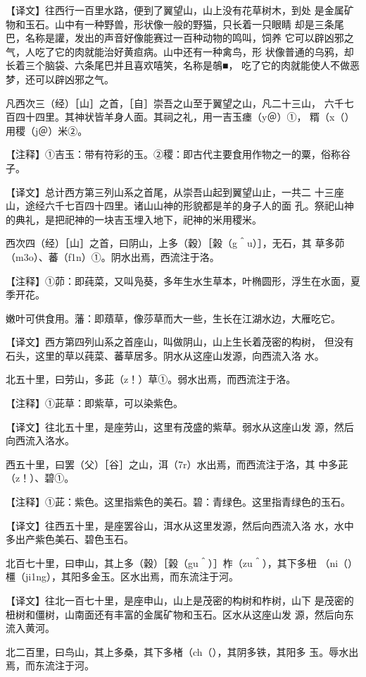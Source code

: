 \documentclass[a4paper,12pt,UTF8,twoside]{ctexbook}
\begin{document}
【译文】往西行一百里水路，便到了翼望山，山上没有花草树木，到处 是金属矿物和玉石。山中有一种野兽，形状像一般的野猫，只长着一只眼睛 却是三条尾巴，名称是讙，发出的声音好像能赛过一百种动物的鸣叫，饲养 它可以辟凶邪之气，人吃了它的肉就能治好黄疸病。山中还有一种禽鸟，形 状像普通的乌鸦，却长着三个脑袋、六条尾巴并且喜欢嘻笑，名称是鵸■， 吃了它的肉就能使人不做恶梦，还可以辟凶邪之气。

凡西次三（经）［山］之首，［自］崇吾之山至于翼望之山，凡二十三山， 六千七百四十四里。其神状皆羊身人面。其祠之礼，用一吉玉瘗（y＠）①， 糈（x（）用稷（j＠）米②。

【注释】①吉玉：带有符彩的玉。②稷：即古代主要食用作物之一的粟，俗称谷子。

【译文】总计西方第三列山系之首尾，从崇吾山起到翼望山止，一共二 十三座山，途经六千七百四十四里。诸山山神的形貌都是羊的身子人的面 孔。祭祀山神的典礼，是把祀神的一块吉玉埋入地下，祀神的米用稷米。

西次四（经）［山］之首，曰阴山，上多（穀）［榖（g＾u）］，无石，其 草多茆（m3o）、蕃（f1n）①。阴水出焉，西流注于洛。

【注释】①茆：即莼菜，又叫凫葵，多年生水生草本，叶椭圆形，浮生在水面，夏季开花。

嫩叶可供食用。藩：即薠草，像莎草而大一些，生长在江湖水边，大雁吃它。

【译文】西方第四列山系之首座山，叫做阴山，山上生长着茂密的构树， 但没有石头，这里的草以莼菜、蕃草居多。阴水从这座山发源，向西流入洛 水。

北五十里，曰劳山，多茈（z！）草①。弱水出焉，而西流注于洛。

【注释】①茈草：即紫草，可以染紫色。

【译文】往北五十里，是座劳山，这里有茂盛的紫草。弱水从这座山发 源，然后向西流入洛水。

西五十里，曰罢（父）［谷］之山，洱（7r）水出焉，而西流注于洛，其 中多茈（z！）、碧①。

【注释】①茈：紫色。这里指紫色的美石。碧：青绿色。这里指青绿色的玉石。

【译文】往西五十里，是座罢谷山，洱水从这里发源，然后向西流入洛 水，水中多出产紫色美石、碧色玉石。

北百七十里，曰申山，其上多（穀）［榖（gu＾）］柞（zu＾），其下多杻 （ni（）橿（ji1ng），其阳多金玉。区水出焉，而东流注于河。

【译文】往北一百七十里，是座申山，山上是茂密的构树和柞树，山下 是茂密的杻树和僵树，山南面还有丰富的金属矿物和玉石。区水从这座山发 源，然后向东流入黄河。

北二百里，曰鸟山，其上多桑，其下多楮（ch（），其阴多铁，其阳多 玉。辱水出焉，而东流注于河。
\end{document}
